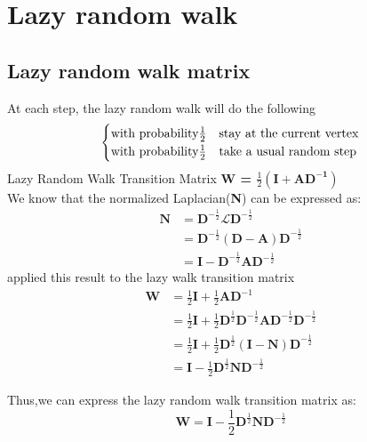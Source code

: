 \documentclass[11pt]{article}
\begin{document}
\section{Lazy random walk}
\subsection{Lazy random walk matrix}
At each step, the lazy random walk will do the following
\[
\begin{cases} 
      $with probability$ \frac{1}{2} & $stay at the current vertex$ \\
      $with probability$ \frac{1}{2} & $take a usual random step$ \\
\end{cases}
\]
Lazy Random Walk Transition Matrix \textbf{W =  $\frac{1}{2}\mathbf{(I + AD^{-1})}$}\\
We know that the normalized Laplacian(\textbf{N}) can be expressed as:\\
\begin{equation*}
\begin{split}
 \mathbf{N} & = \mathbf{D}^{-\frac{1}{2}}\mathbf{\mathcal{L}D}^{-\frac{1}{2}}\\
   & = \mathbf{D}^{-\frac{1}{2}}\mathbf{(D-A)D}^{-\frac{1}{2}}\\
   & = \mathbf{I - D}^{-\frac{1}{2}}\mathbf{AD}^{-\frac{1}{2}}
\end{split}    
\end{equation*}
applied this result to the lazy walk transition matrix\\
\begin{equation*}
\begin{split}
 \mathbf{W} & =  \frac{1}{2}\mathbf{I} + \frac{1}{2}\mathbf{AD}^{-1} \\
   & = \frac{1}{2}\mathbf{I} + \frac{1}{2}\mathbf{D}^{\frac{1}{2}}\mathbf{D}^{-\frac{1}{2}}\mathbf{AD}^{-\frac{1}{2}}\mathbf{D}^{-\frac{1}{2}}\\
   & = \frac{1}{2}\mathbf{I} + \frac{1}{2}\mathbf{D}^{\frac{1}{2}}\mathbf{(I-N)D}^{-\frac{1}{2}}\\
   & = \mathbf{I} - \frac{1}{2}\mathbf{D}^{\frac{1}{2}}\mathbf{ND}^{-\frac{1}{2}}
\end{split}    
\end{equation*}

Thus,we can express the lazy random walk transition matrix as:\\
\begin{equation}
    \mathbf{W = I} - \frac{1}{2}\mathbf{D}^{\frac{1}{2}}\mathbf{ND}^{-\frac{1}{2}}
\end{equation}
\end{document}
